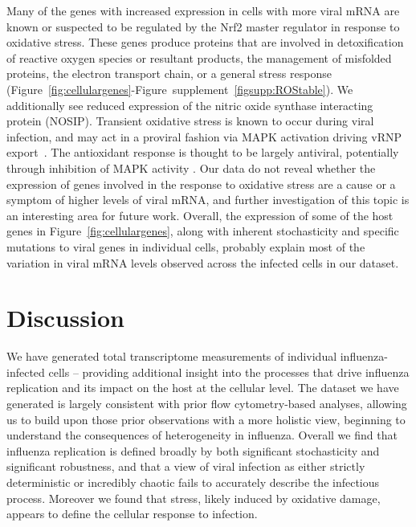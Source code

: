 \documentclass[9pt,lineno]{elife}
\begin{document}
Many of the genes with increased expression in cells with more viral mRNA are known or suspected to be regulated by the Nrf2 master regulator in response to oxidative stress.
These genes produce proteins that are involved in detoxification of reactive oxygen species or resultant products, the management of misfolded proteins, the electron transport chain, or a general stress response (Figure~\ref{fig:cellulargenes}-Figure~supplement~\ref{figsupp:ROStable}). 
We additionally see reduced expression of the nitric oxide synthase interacting protein (NOSIP). 
Transient oxidative stress is known to occur during viral infection, and may act in a proviral fashion via MAPK activation driving vRNP export~\citep{Amatore:2014cs}.
The antioxidant response is thought to be largely antiviral, potentially through inhibition of MAPK activity \citep{Lin:2016ec,Sgarbanti:2014ht}.
Our data do not reveal whether the expression of genes involved in the response to oxidative stress are a cause or a symptom of higher levels of viral mRNA, and further investigation of this topic is an interesting area for future work.
Overall, the expression of some of the host genes in Figure~\ref{fig:cellulargenes}, along with inherent stochasticity and specific mutations to viral genes in individual cells, probably explain most of the variation in viral mRNA levels observed across the infected cells in our dataset.

\section{Discussion}
We have generated total transcriptome measurements of individual influenza-infected cells -- providing additional insight into the processes that drive influenza replication and its impact on the host at the cellular level.
The dataset we have generated is largely consistent with prior flow cytometry-based analyses, allowing us to build upon those prior observations with a more holistic view, beginning to understand the consequences of heterogeneity in influenza.
Overall we find that influenza replication is defined broadly by both significant stochasticity and significant robustness, and that a view of viral infection as either strictly deterministic or incredibly chaotic fails to accurately describe the infectious process.
Moreover we found that stress, likely induced by oxidative damage, appears to define the cellular response to infection.
\end{document}
